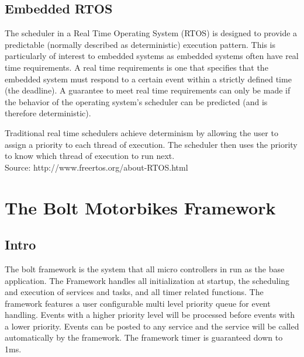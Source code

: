 \documentclass[12pt compsoc]{article}
\begin{document}
\subsection{Embedded RTOS}
The scheduler in a Real Time Operating System (RTOS) is designed to provide a predictable (normally described as deterministic) execution pattern. This is particularly of interest to embedded systems as embedded systems often have real time requirements. A real time requirements is one that specifies that the embedded system must respond to a certain event within a strictly defined time (the deadline). A guarantee to meet real time requirements can only be made if the behavior of the operating system's scheduler can be predicted (and is therefore deterministic).

Traditional real time schedulers achieve determinism by allowing the user to assign a priority to each thread of execution. The scheduler then uses the priority to know which thread of execution to run next.
\\

Source: http://www.freertos.org/about-RTOS.html



\section{The Bolt Motorbikes Framework}
\subsection{Intro}
The bolt framework is the system that all micro controllers in run as the base application. The Framework handles all initialization at startup, the scheduling and execution of services and tasks, and all timer related functions. The framework features a user configurable multi level priority queue for event handling. Events with a higher priority level will be processed before events with a lower priority. Events can be posted to any service and the service will be called automatically by the framework. The framework timer is guaranteed down to 1ms.
\end{document}
